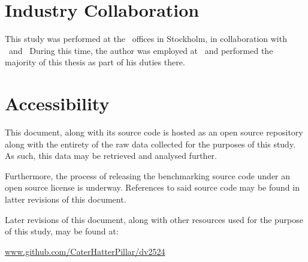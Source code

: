 \section*{Industry Collaboration}
\label{sec:preface_industrycollaboration}
This study was performed at the \dvttermintel\ offices in Stockholm, in collaboration with \dvttermintel\ and \dvttermwindriver\
During this time, the author was employed at \dvttermintel\ and performed the majority of this thesis as part of his duties there.

\section*{Accessibility}
\label{sec:preface_accessibility}
This document, along with its source code is hosted as an open source repository along with the entirety of the raw data collected for the purposes of this study.
As such, this data may be retrieved and analysed further.

Furthermore, the process of releasing the benchmarking source code under an open source license is underway.
References to said source code may be found in latter revisions of this document.

Later revisions of this document, along with other resources used for the purpose of this study, may be found at:
\begin{center}
\href{https://github.com/CaterHatterPillar/dv2524}{www.github.com/CaterHatterPillar/dv2524}
\end{center}
